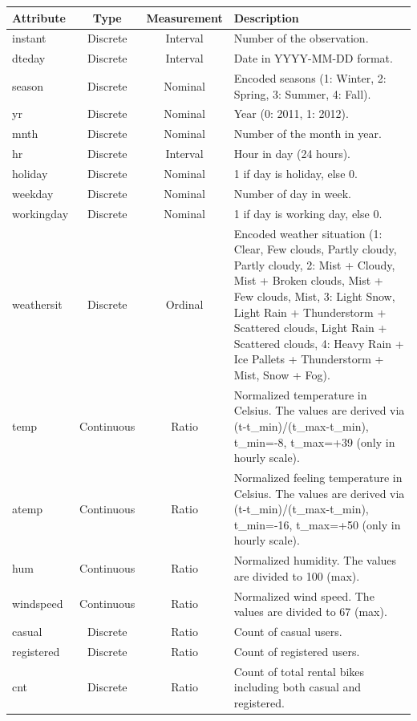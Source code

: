\documentclass[11pt,a4paper]{article}
\begin{document}
\begin{center}
\begin{tabular}{|l|c|c|p{7cm}|}
\hline
\textbf{Attribute} & \textbf{Type} & \textbf{Measurement} & \textbf{Description} \\
\hline
instant & Discrete & Interval & Number of the observation. \\
\hline
dteday & Discrete & Interval & Date in YYYY-MM-DD format. \\
\hline
season & Discrete & Nominal & Encoded seasons (1: Winter, 2: Spring, 3: Summer, 4: Fall). \\
\hline
yr & Discrete & Nominal & Year (0: 2011, 1: 2012). \\
\hline
mnth & Discrete & Nominal & Number of the month in year. \\
\hline
hr & Discrete & Interval & Hour in day (24 hours). \\
\hline
holiday & Discrete & Nominal & 1 if day is holiday, else 0. \\
\hline
weekday & Discrete & Nominal & Number of day in week. \\
\hline
workingday & Discrete & Nominal & 1 if day is working day, else 0. \\
\hline
weathersit & Discrete & Ordinal & Encoded weather situation (1: Clear, Few clouds, Partly cloudy, Partly cloudy, 2: Mist + Cloudy, Mist + Broken clouds, Mist + Few clouds, Mist, 3: Light Snow, Light Rain + Thunderstorm + Scattered clouds, Light Rain + Scattered clouds, 4: Heavy Rain + Ice Pallets + Thunderstorm + Mist, Snow + Fog). \\
\hline
temp & Continuous & Ratio & Normalized temperature in Celsius. The values are derived via (t-t\_min)/(t\_max-t\_min), t\_min=-8, t\_max=+39 (only in hourly scale). \\
\hline
atemp & Continuous & Ratio & Normalized feeling temperature in Celsius. The values are derived via (t-t\_min)/(t\_max-t\_min), t\_min=-16, t\_max=+50 (only in hourly scale). \\
\hline
hum & Continuous & Ratio & Normalized humidity. The values are divided to 100 (max). \\
\hline
windspeed & Continuous & Ratio & Normalized wind speed. The values are divided to 67 (max). \\
\hline
casual & Discrete & Ratio & Count of casual users. \\
\hline
registered & Discrete & Ratio & Count of registered users. \\
\hline
cnt & Discrete & Ratio & Count of total rental bikes including both casual and registered. \\
\hline
\end{tabular}
\end{center}
\end{document}
